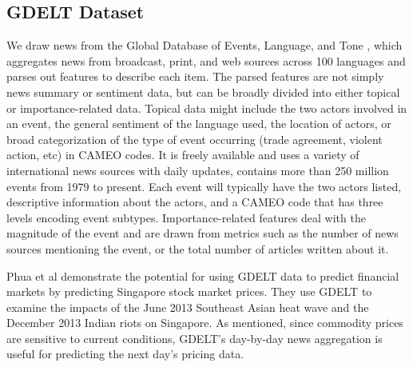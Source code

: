 \subsection{GDELT Dataset}
We draw news from the Global Database of Events, Language, and Tone \cite{GDELT}, which aggregates news from broadcast, print, and web sources across 100 languages and parses out features to describe each item. The parsed features are not simply news summary or sentiment data, but can be broadly divided into either topical or importance-related data. Topical data might include the two actors involved in an event, the general sentiment of the language used, the location of actors, or broad categorization of the type of event occurring (trade agreement, violent action, etc) in CAMEO codes. It is freely available and uses a variety of international news sources with daily updates, contains more than 250 million events from 1979 to present. Each event will typically have the two actors listed, descriptive information about the actors, and a CAMEO code that has three levels encoding event subtypes. Importance-related features deal with the magnitude of the event and are drawn from metrics such as the number of news sources mentioning the event, or the total number of articles written about it. 

Phua et al demonstrate the potential for using GDELT data to predict financial markets by predicting Singapore stock market prices. They use GDELT  to examine the impacts of the June 2013 Southeast Asian heat wave and the December 2013 Indian riots on Singapore\cite{phua2014visual}. As mentioned, since commodity prices are sensitive to current conditions, GDELT's day-by-day news aggregation is useful for predicting the next day's pricing data.
